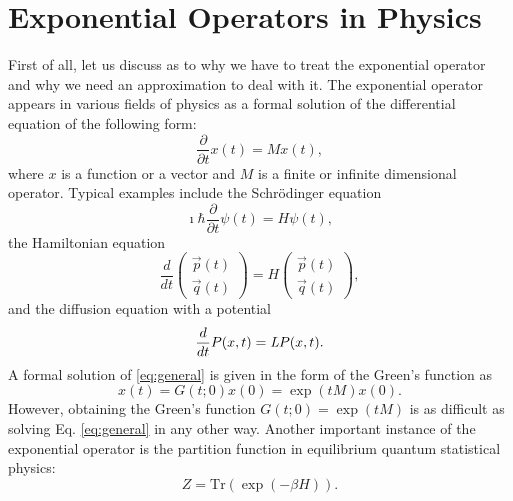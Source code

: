 \section{Exponential Operators in Physics}
First of all, let us discuss as to why we have to treat the exponential operator and why we need an approximation to deal with it. The exponential operator appears in various fields of physics as a formal solution of the differential equation of the following form:
\begin{equation} \label{eq:general}
\dfrac{\partial}{\partial t} x(t) = M x(t),
\end{equation}
where $x$ is a function or a vector and $M$ is a finite or infinite dimensional operator. Typical examples include the Schr\"odinger equation
\begin{equation}
\imath\hbar\dfrac{\partial}{\partial t} \psi(t) = H\psi(t),
\end{equation}
the Hamiltonian equation
\begin{equation}
\dfrac{d}{d t} 
\begin{pmatrix}
\vec{p}(t) \\ \vec{q}(t)
\end{pmatrix}
= H
\begin{pmatrix}
\vec{p}(t) \\ \vec{q}(t)
\end{pmatrix},
\end{equation}
and the diffusion equation with a potential
\begin{equation}
\dfrac{d}{dt}P(x,t) = \emph{L} P(x,t).
\end{equation}
A formal solution of \eqref{eq:general} is given in the form of the Green's function as 
\begin{equation}
x(t) = G(t;0)x(0) = \exp\left({tM}\right)x(0).
\end{equation}
However, obtaining the Green's function $G(t;0) = \exp{(tM)}$ is as difficult as solving Eq. \eqref{eq:general} in any other way. Another important instance of the exponential operator is the partition function in equilibrium quantum statistical physics:
\begin{equation}
Z = \mathrm{Tr}\left(\exp\left({- \beta H}\right)\right).
\end{equation}

